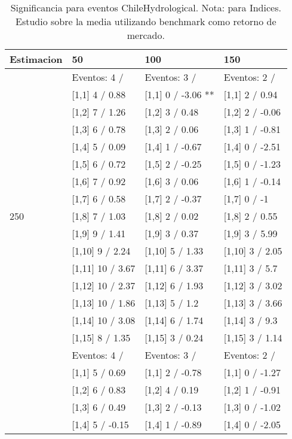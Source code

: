 \begin{table}

\caption{Significancia para eventos ChileHydrological. Nota: para Indices. Estudio sobre la media utilizando benchmark como retorno de mercado.}
\centering
\begin{tabular}[t]{llll}
\toprule
Estimacion & 50 & 100 & 150\\
\midrule
 & Eventos:  4 / & Eventos:  3 / & Eventos:  2 /\\
 & {}[1,1] 4  / 0.88 & {}[1,1] 0  / -3.06 ** & {}[1,1] 2  / 0.94\\
 & {}[1,2] 7  / 1.26 & {}[1,2] 3  / 0.48 & {}[1,2] 2  / -0.06\\
 & {}[1,3] 6  / 0.78 & {}[1,3] 2  / 0.06 & {}[1,3] 1  / -0.81\\
 & {}[1,4] 5  / 0.09 & {}[1,4] 1  / -0.67 & {}[1,4] 0  / -2.51\\
\addlinespace
 & {}[1,5] 6  / 0.72 & {}[1,5] 2  / -0.25 & {}[1,5] 0  / -1.23\\
 & {}[1,6] 7  / 0.92 & {}[1,6] 3  / 0.06 & {}[1,6] 1  / -0.14\\
 & {}[1,7] 6  / 0.58 & {}[1,7] 2  / -0.37 & {}[1,7] 0  / -1\\
250 & {}[1,8] 7  / 1.03 & {}[1,8] 2  / 0.02 & {}[1,8] 2  / 0.55\\
 & {}[1,9] 9  / 1.41 & {}[1,9] 3  / 0.37 & {}[1,9] 3  / 5.99\\
\addlinespace
 & {}[1,10] 9  / 2.24 & {}[1,10] 5  / 1.33 & {}[1,10] 3  / 2.05\\
 & {}[1,11] 10  / 3.67 & {}[1,11] 6  / 3.37 & {}[1,11] 3  / 5.7\\
 & {}[1,12] 10  / 2.37 & {}[1,12] 6  / 1.93 & {}[1,12] 3  / 3.02\\
 & {}[1,13] 10  / 1.86 & {}[1,13] 5  / 1.2 & {}[1,13] 3  / 3.66\\
 & {}[1,14] 10  / 3.08 & {}[1,14] 6  / 1.74 & {}[1,14] 3  / 9.3\\
\addlinespace
 & {}[1,15] 8  / 1.35 & {}[1,15] 3  / 0.24 & {}[1,15] 3  / 1.14\\
 & Eventos:  4 / & Eventos:  3 / & Eventos:  2 /\\
 & {}[1,1] 5  / 0.69 & {}[1,1] 2  / -0.78 & {}[1,1] 0  / -1.27\\
 & {}[1,2] 6  / 0.83 & {}[1,2] 4  / 0.19 & {}[1,2] 1  / -0.91\\
 & {}[1,3] 6  / 0.49 & {}[1,3] 2  / -0.13 & {}[1,3] 0  / -1.02\\
\addlinespace
 & {}[1,4] 5  / -0.15 & {}[1,4] 1  / -0.89 & {}[1,4] 0  / -2.05\\

\end{tabular}
\end{table}
